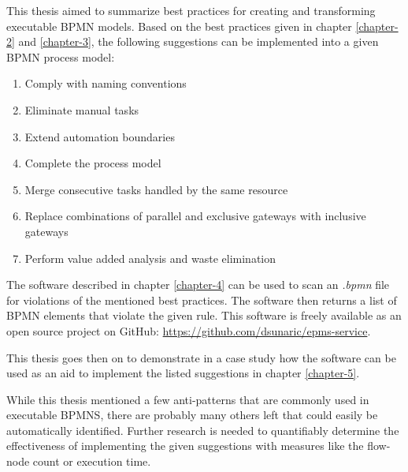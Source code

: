 This thesis aimed to summarize best practices for creating and transforming executable BPMN models. Based on the best practices given in chapter \ref{chapter-2} and \ref{chapter-3}, the following suggestions can be implemented into a given BPMN process model:
\begin{enumerate}
	\item Comply with naming conventions
	\item Eliminate manual tasks
	\item Extend automation boundaries
	\item Complete the process model
	\item Merge consecutive tasks handled by the same resource
	\item Replace combinations of parallel and exclusive gateways with inclusive gateways
	\item Perform value added analysis and waste elimination
\end{enumerate}

The software described in chapter \ref{chapter-4} can be used to scan an \textit{.bpmn} file for violations of the mentioned best practices. The software then returns a list of BPMN elements that violate the given rule. This software is freely available as an open source project on GitHub:  \url{https://github.com/dsunaric/epms-service}. 

This thesis goes then on to demonstrate in a case study how the software can be used as an aid to implement the listed suggestions in chapter \ref{chapter-5}. 

While this thesis mentioned a few anti-patterns that are commonly used in executable BPMNS, there are probably many others left that could easily be automatically identified. Further research is needed to quantifiably determine the effectiveness of implementing the given suggestions with measures like the flow-node count or execution time. 